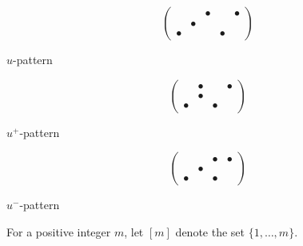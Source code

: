 \documentclass[12pt]{amsart}
\theoremstyle{definition}
\numberwithin{equation}{section}
\numberwithin{table}{thm}
\begin{document}
\begin{center}
    \begin{minipage}{5cm}
        \[\begin{pmatrix}
            & & \bullet& &\bullet\\
            & \bullet& & &\\
            \bullet & & &\bullet& 
        \end{pmatrix}\]

        \vspace{5mm}
        \centering $u$-pattern
    \end{minipage}
    \begin{minipage}{5cm}
        \[\begin{pmatrix}
            & \bullet& &\bullet\\
            & \bullet& & \\
            \bullet & & \bullet& 
        \end{pmatrix}\]

        \vspace{5mm}
        \centering $u^+$-pattern
    \end{minipage}
    \begin{minipage}{5cm}

        \[\begin{pmatrix}
            & & \bullet& \bullet\\
            & \bullet& & \\
            \bullet & & \bullet& 
        \end{pmatrix}\]

        \vspace{5mm}
        \centering $u^-$-pattern
    \end{minipage}
\end{center}




\vspace{3mm}
For a positive integer $m$, let $[m]$ denote the set $\{1,\dots,m\}$.
\end{document}
